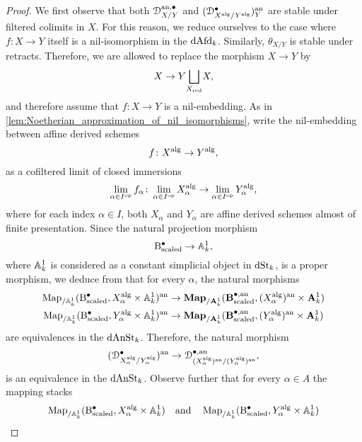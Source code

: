 \documentclass[10pt,a4paper,reqno]{amsart} %
\theoremstyle{plain}
\theoremstyle{definition}
\theoremstyle{remark}
\numberwithin{equation}{section}
\begin{document}
\begin{proof}
    We first observe that both $\mathcal D_{X/Y}^{\mathrm{an}, \bullet}$ and $(\mathcal D_{X^\mathrm{alg}/ Y^\mathrm{alg}}^\bullet)^\mathrm{an}_Y$ are stable under filtered
    colimits in $X$. For this reason, we reduce ourselves to the case where $f \colon X \to Y$ itself is a nil-isomorphism in the \infcat
    $\mathrm{dAfd}_k$. Similarly, $\theta_{X/ Y}$ is stable under retracts. Therefore, we are allowed to replace the morphism $X \to Y$
    by
        \[  
            X \to Y \underset{X_{\mathrm{red}}}{\bigsqcup} X,
        \]
    and therefore assume that $f \colon X \to Y$ is a nil-embedding.
    As in \cref{lem:Noetherian_approximation_of_nil_isomorphisms}, write the nil-embedding between affine derived schemes
        \[
            f \colon X^\mathrm{alg} \to Y^\mathrm{alg},  
        \]
    as a cofiltered limit of closed immersions
        \[\lim_{\alpha \in I^\mathrm{op}} f_\alpha \colon \lim_{\alpha \in I^\mathrm{op}} X_\alpha^\mathrm{alg} \to \lim_{\alpha \in I^\mathrm{op}} Y_\alpha^\mathrm{alg},\]
    where for each index $\alpha \in I$, both $X_\alpha$
    and $Y_\alpha$ are affine derived schemes almost of finite presentation. Since the natural projection morphism
        \[
            \mathrm{B}_\mathrm{scaled}^\bullet \to \mathbb A^1_k, 
        \]
    where $\mathbb A^1_k$ is considered as a constant simplicial object in $\mathrm{dSt}_k$, is a proper morphism, we deduce from \cite[Theorem 6.13]{Holstein_Analytification_of_mapping_stacks}
    that for every $\alpha$, the natural morphisms
        \begin{align*}
            \operatorname{Map}_{/\mathbb A^1_k}(\mathrm{B}^\bullet_\mathrm{scaled}, X_\alpha^\mathrm{alg} \times \mathbb A^1_k)^\mathrm{an} & \to \mathbf{Map}_{/ \mathbf A^1_k}(\mathbf{B}^{\bullet, \mathrm{an}}_\mathrm{scaled} , (X_\alpha^\mathrm{alg})^\mathrm{an} \times \mathbf A^1_k) \\
            \operatorname{Map}_{/\mathbb A^1_k}(\mathrm{B}^\bullet_\mathrm{scaled}, Y_\alpha^\mathrm{alg} \times \mathbb A^1_k)^\mathrm{an} & \to \mathbf{Map}_{/ \mathbf A^1_k}(\mathbf{B}^{\bullet, \mathrm{an}}_\mathrm{scaled} , (Y_\alpha^\mathrm{alg})^\mathrm{an} \times \mathbf A^1_k)
        \end{align*}
    are equivalences in the \infcat $\mathrm{dAnSt}_k$. Therefore, the natural morphism
        \[
            (\mathcal D_{X^\mathrm{alg}_\alpha/Y^\mathrm{alg}_\alpha}^\bullet )^\mathrm{an}  \to \mathcal D_{(X_\alpha ^\mathrm{alg})^\mathrm{an}/ (Y_\alpha ^\mathrm{alg})^\mathrm{an}}^{\bullet, \mathrm{an}},
        \]
    is an equivalence in the \infcat $\mathrm{dAnSt}_k$. Observe further that for every $\alpha \in A$ the mapping stacks
        \[
            \operatorname{Map}_{/ \mathbb A^1_k}(\mathrm{B}^\bullet_\mathrm{scaled}, X_\alpha^\mathrm{alg} \times \mathbb A^1_k) \quad \mathrm{and} \quad \operatorname{Map}_{/ \mathbb A^1_k}(\mathrm{B}^\bullet_\mathrm{scaled}, Y_\alpha^\mathrm{alg} \times \mathbb A^1_k)  
\]
\end{proof}
\end{document}
